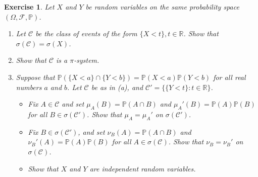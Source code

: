 \documentclass{article}
\newtheorem{exercise}[theorem]{Exercise}
\begin{document}
\begin{exercise}
Let $X$ and $Y$ be random variables on the same probability space $(\Omega,\mathcal{F},\mathbb{P})$.
\begin{enumerate}
    \item[(a)] Let $\mathcal{C}$ be the class of events of the form $\{X<t\},t\in\mathbb{R}$. Show that $\sigma(\mathcal{C})=\sigma(X)$.
    \item[(b)] Show that $\mathcal{C}$ is a $\pi$-system.
    \item[(c)] Suppose that $\mathbb{P}(\{X<a\}\cap\{Y<b\})=\mathbb{P}(X<a)\mathbb{P}(Y<b)$ for all real numbers $a$ and $b$. Let $\mathcal{C}$ be as in (a), and $\mathcal{C}'=\{\{Y<t\}:t\in\mathbb{R}\}$.
    \begin{itemize}
        \item[1.] Fix $A\in\mathcal{C}$ and set $\mu_A(B)=\mathbb{P}(A\cap B)$ and $\mu_A'(B)=\mathbb{P}(A)\mathbb{P}(B)$ for all $B\in\sigma(\mathcal{C}')$. Show that $\mu_A=\mu_A'$ on $\sigma(\mathcal{C}')$.
        \item[2.] Fix $B\in\sigma(\mathcal{C}')$, and set $\nu_B(A)=\mathbb{P}(A\cap B)$ and $\nu_B'(A)=\mathbb{P}(A)\mathbb{P}(B)$ for all $A\in\sigma(\mathcal{C})$. Show that $\nu_B=\nu_B'$ on $\sigma(\mathcal{C})$.
        \item[3.] Show that $X$ and $Y$ are independent random variables.
    \end{itemize}
\end{enumerate}
\end{exercise}
\end{document}

